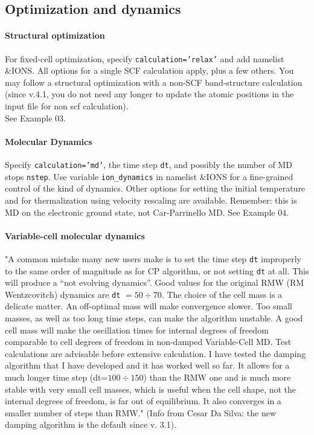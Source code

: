 \documentclass[12pt,a4paper]{article}
\begin{document}
\subsection{Optimization and dynamics}

\paragraph{Structural optimization}
For fixed-cell optimization, specify \texttt{calculation='relax'} and 
add namelist \&IONS. All options for a single SCF calculation apply, 
plus a few others. You
may follow a structural optimization with a non-SCF band-structure
calculation (since v.4.1, you do not need any longer to update the 
atomic positions in the input file for non scf calculation).\\
See Example 03.

\paragraph{Molecular Dynamics} 
Specify \texttt{calculation='md'}, the time step \texttt{dt}, and possibly the number of MD stops \texttt{nstep}.
Use variable \texttt{ion\_dynamics} in namelist \&IONS for a fine-grained control
of the kind of dynamics. Other options for setting the initial
temperature and for thermalization using velocity rescaling are
available. Remember: this is MD on the electronic ground state, not
Car-Parrinello MD.
See Example 04.

\paragraph{Variable-cell molecular dynamics}

"A common mistake many new users make is to set the time step \texttt{dt}
improperly to the same order of magnitude as for CP algorithm, or
not setting \texttt{dt} at all. This will produce a ``not evolving dynamics''.
Good values for the original RMW (RM Wentzcovitch) dynamics are 
\texttt{dt} $ = 50 \div 70$. The choice of the cell mass is a delicate matter. An
off-optimal mass will make convergence slower. Too small masses, as
well as too long time steps, can make the algorithm unstable. A good
cell mass will make the oscillation times for internal degrees of
freedom comparable to cell degrees of freedom in non-damped
Variable-Cell MD. Test calculations are advisable before extensive
calculation. I have tested the damping algorithm that I have developed
and it has worked well so far. It allows for a much longer time step
(dt=$100 \div 150$) than the RMW one and is much more stable with very
small cell masses, which is useful when the cell shape, not the
internal degrees of freedom, is far out of equilibrium. It also
converges in a smaller number of steps than RMW." (Info from Cesar Da
Silva: the new damping algorithm is the default since v. 3.1).
\end{document}
